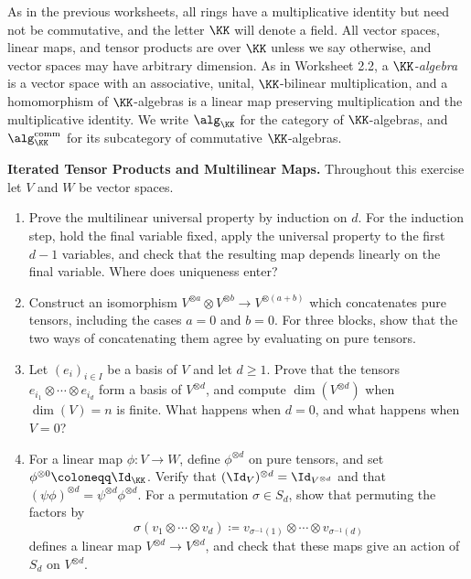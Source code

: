 \documentclass[12pt,reqno]{amsart}
\begin{document}
As in the previous worksheets, all rings have a multiplicative identity but need not be commutative, and the letter $\KK$ will denote a field. All vector spaces, linear maps, and tensor products are over $\KK$ unless we say otherwise, and vector spaces may have arbitrary dimension. As in Worksheet 2.2, a \emph{$\KK$-algebra} is a vector space with an associative, unital, $\KK$-bilinear multiplication, and a homomorphism of $\KK$-algebras is a linear map preserving multiplication and the multiplicative identity. We write $\alg_{\KK}$ for the category of $\KK$-algebras, and $\alg_{\KK}^{\mathrm{comm}}$ for its subcategory of commutative $\KK$-algebras.

\hrulefill

\begin{problems}
\item\label{s:iterated} \textbf{Iterated Tensor Products and Multilinear Maps.} Throughout this exercise let $V$ and $W$ be vector spaces.
\begin{enumerate}
\item Prove the multilinear universal property by induction on $d$. For the induction step, hold the final variable fixed, apply the universal property to the first $d-1$ variables, and check that the resulting map depends linearly on the final variable. Where does uniqueness enter?
\item Construct an isomorphism $V^{\otimes a}\otimes V^{\otimes b}\to V^{\otimes(a+b)}$ which concatenates pure tensors, including the cases $a=0$ and $b=0$. For three blocks, show that the two ways of concatenating them agree by evaluating on pure tensors.
\item Let $(e_i)_{i\in I}$ be a basis of $V$ and let $d\geq1$. Prove that the tensors $e_{i_1}\otimes\cdots\otimes e_{i_d}$ form a basis of $V^{\otimes d}$, and compute $\dim(V^{\otimes d})$ when $\dim(V)=n$ is finite. What happens when $d=0$, and what happens when $V=0$?
\item For a linear map $\phi:V\to W$, define $\phi^{\otimes d}$ on pure tensors, and set $\phi^{\otimes0}\coloneqq\Id_{\KK}$. Verify that $(\Id_V)^{\otimes d}=\Id_{V^{\otimes d}}$ and that $(\psi\phi)^{\otimes d}=\psi^{\otimes d}\phi^{\otimes d}$. For a permutation $\sigma\in S_d$, show that permuting the factors by
\[
\sigma(v_1\otimes\cdots\otimes v_d)\coloneqq v_{\sigma^{-1}(1)}\otimes\cdots\otimes v_{\sigma^{-1}(d)}
\]
defines a linear map $V^{\otimes d}\to V^{\otimes d}$, and check that these maps give an action of $S_d$ on $V^{\otimes d}$.
\end{enumerate}
\end{problems}
\end{document}

